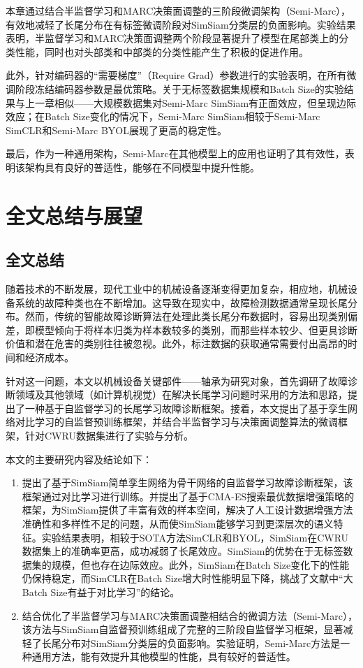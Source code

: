 \documentclass[master]{thesis-uestc}
\begin{document}
本章通过结合半监督学习和MARC决策面调整的三阶段微调架构（Semi-Marc），有效地减轻了长尾分布在有标签微调阶段对SimSiam分类层的负面影响。实验结果表明，半监督学习和MARC决策面调整两个阶段显著提升了模型在尾部类上的分类性能，同时也对头部类和中部类的分类性能产生了积极的促进作用。

此外，针对编码器的“需要梯度”（Require Grad）参数进行的实验表明，在所有微调阶段冻结编码器参数是最优策略。关于无标签数据集规模和Batch Size的实验结果与上一章相似——大规模数据集对Semi-Marc SimSiam有正面效应，但呈现边际效应；在Batch Size变化的情况下，Semi-Marc SimSiam相较于Semi-Marc SimCLR和Semi-Marc BYOL展现了更高的稳定性。

最后，作为一种通用架构，Semi-Marc在其他模型上的应用也证明了其有效性，表明该架构具有良好的普适性，能够在不同模型中提升性能。

\chapter{全文总结与展望}

\section{全文总结}
随着技术的不断发展，现代工业中的机械设备逐渐变得更加复杂，相应地，机械设备系统的故障种类也在不断增加。这导致在现实中，故障检测数据通常呈现长尾分布。然而，传统的智能故障诊断算法在处理此类长尾分布数据时，容易出现类别偏差，即模型倾向于将样本归类为样本数较多的类别，而那些样本较少、但更具诊断价值和潜在危害的类别往往被忽视。此外，标注数据的获取通常需要付出高昂的时间和经济成本。

针对这一问题，本文以机械设备关键部件——轴承为研究对象，首先调研了故障诊断领域及其他领域（如计算机视觉）在解决长尾学习问题时采用的方法和思路，提出了一种基于自监督学习的长尾学习故障诊断框架。接着，本文提出了基于孪生网络对比学习的自监督预训练框架，并结合半监督学习与决策面调整算法的微调框架，针对CWRU数据集进行了实验与分析。

本文的主要研究内容及结论如下：
\begin{enumerate}[label={(\arabic*)}]
    \item 提出了基于SimSiam简单孪生网络为骨干网络的自监督学习故障诊断框架，该框架通过对比学习进行训练。并提出了基于CMA-ES搜索最优数据增强策略的框架，为SimSiam提供了丰富有效的样本空间，解决了人工设计数据增强方法准确性和多样性不足的问题，从而使SimSiam能够学习到更深层次的语义特征。实验结果表明，相较于SOTA方法SimCLR和BYOL，SimSiam在CWRU数据集上的准确率更高，成功减弱了长尾效应。SimSiam的优势在于无标签数据集的规模，但也存在边际效应。此外，SimSiam在Batch Size变化下的性能仍保持稳定，而SimCLR在Batch Size增大时性能明显下降，挑战了文献\cite{chen2020simple}中“大Batch Size有益于对比学习”的结论。
    \item 结合优化了半监督学习与MARC决策面调整相结合的微调方法（Semi-Marc），该方法与SimSiam自监督预训练组成了完整的三阶段自监督学习框架，显著减轻了长尾分布对SimSiam分类层的负面影响。实验证明，Semi-Marc方法是一种通用方法，能有效提升其他模型的性能，具有较好的普适性。
\end{enumerate}
\end{document}
